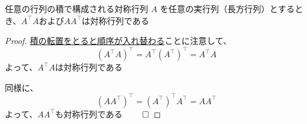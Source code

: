 \documentclass[../../../topic_linear-algebra]{subfiles}
\begin{document}
\begin{theorem}{任意の行列の積で構成される対称行列}\label{thm:symmetric-products-of-any-matrix}
  $A$ を任意の実行列（長方行列）とするとき、$A^\top A$および$AA^\top$は対称行列である
\end{theorem}

\begin{proof}
  \hyperref[thm:transpose-of-product]{積の転置をとると順序が入れ替わる}ことに注意して、
  \begin{equation*}
    (A^\top A)^\top = A^\top(A^\top)^\top = A^\top A
  \end{equation*}
  よって、$A^\top A$は対称行列である

  \br

  同様に、
  \begin{equation*}
    (AA^\top)^\top = (A^\top)^\top A^\top = AA^\top
  \end{equation*}
  よって、$AA^\top$も対称行列である $\qed$
\end{proof}
\end{document}
